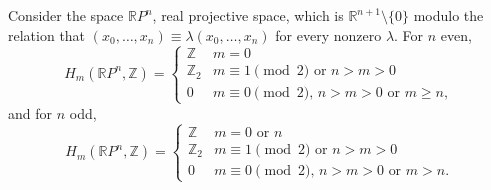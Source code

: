 \documentclass[12pt]{article}
\newcommand{\R}{\mathbb{R}}
\newcommand{\Z}{\mathbb{Z}}
\begin{document}
Consider the space $\R P^n$, real projective space, which is $\R^{n+1}\setminus\{0\}$ modulo the relation that $(x_0,\ldots,x_n)\equiv \lambda(x_0,\ldots,x_n)$ for every nonzero $\lambda$. For $n$ even,
\[
H_m(\R P^n,\Z)=\begin{cases}
\Z	&	m=0\\ 
\Z_2	&	m\equiv 1\pmod 2\text{ or } n>m>0\\ 
0	&	m\equiv 0\pmod 2,\, n>m>0 \text{ or } m\geq n,
\end{cases}
\]
and for $n$ odd,
\[
H_m(\R P^n,\Z)=
\begin{cases}
\Z	&	m=0\text{ or }n\\ 
\Z_2	&	m\equiv 1\pmod 2\text{ or }n>m>0\\
0	&	m\equiv 0\pmod 2,\,n>m>0 \text{ or } m>n.
\end{cases}
\]
\end{document}

